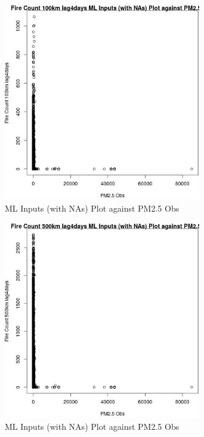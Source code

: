\begin{figure} 
\centering  
\includegraphics[width=0.77\textwidth]{Code_Outputs/Report_ML_input_PM25_Step4_part_f_de_duplicated_aveswNAs_Fire_Count_100km_lag4daysvPM25_Obs.jpg} 
\caption{\label{fig:Report_ML_input_PM25_Step4_part_f_de_duplicated_aveswNAsFire_Count_100km_lag4daysvPM25_Obs}ML Inputs (with NAs) Plot against PM2.5 Obs} 
\end{figure} 
 

\clearpage 

\begin{figure} 
\centering  
\includegraphics[width=0.77\textwidth]{Code_Outputs/Report_ML_input_PM25_Step4_part_f_de_duplicated_aveswNAs_Fire_Count_500km_lag4daysvPM25_Obs.jpg} 
\caption{\label{fig:Report_ML_input_PM25_Step4_part_f_de_duplicated_aveswNAsFire_Count_500km_lag4daysvPM25_Obs}ML Inputs (with NAs) Plot against PM2.5 Obs} 
\end{figure} 
 

